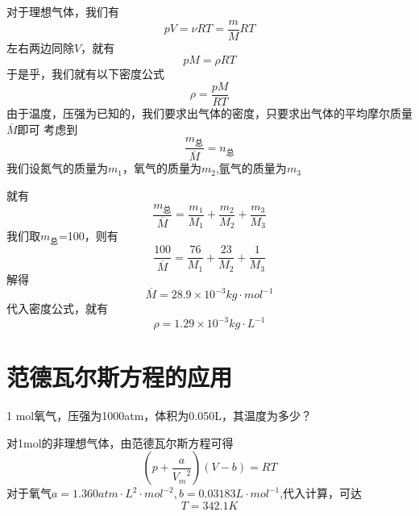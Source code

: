 \documentclass[lang=cn,10pt]{elegantbook}
\begin{document}
	\begin{solution}
		对于理想气体，我们有
		\begin{equation*}
			pV=\nu RT=\frac{m}{M}RT
		\end{equation*}
		左右两边同除$V$，就有
		\begin{equation*}
			pM=\rho RT
		\end{equation*}
		于是乎，我们就有以下密度公式
		\begin{equation}
			\rho=\frac{pM}{RT}
		\end{equation}
		由于温度，压强为已知的，我们要求出气体的密度，只要求出气体的平均摩尔质量$\overline{M}$即可
		考虑到
		\begin{equation*}
			\frac{m_{\text{总}}}{\overline{M}}=n_{\text{总}}
		\end{equation*}
		我们设氮气的质量为$m_{1}$，氧气的质量为$m_{2}$,氩气的质量为$m_{3}$
		
		就有
		\begin{equation*}
			\frac{m_{\text{总}}}{\overline{M}}=\frac{m_{1}}{M_{1}}+\frac{m_{2}}{M_{2}}+\frac{m_{3}}{M_{3}}
		\end{equation*}
		我们取$m_{\text{总}}$=100，则有
		\begin{equation*}
			\frac{100}{\overline{M}}=\frac{76}{M_{1}}+\frac{23}{M_{2}}+\frac{1}{M_{3}}
		\end{equation*}
		解得
		\begin{equation*}
			\overline{M}=28.9\times 10^{-3} kg\cdot mol^{-1}
		\end{equation*}
		代入密度公式，就有
		\begin{equation*}
			\rho =1.29\times 10^{-3}kg\cdot L^{-1}
		\end{equation*}
	\end{solution}
	
	\section{范德瓦尔斯方程的应用}
	
	\begin{example}
		1 mol氧气，压强为1000atm，体积为0.050L，其温度为多少？
	\end{example}
	\begin{solution}
		对1mol的非理想气体，由范德瓦尔斯方程可得
		\begin{equation*}
			\left( p+\frac{a}{{V_m}^2} \right) \left( V-b \right) =RT
		\end{equation*}
		对于氧气$a=1.360atm\cdot L^{2} \cdot mol^{-2},b=0.03183L\cdot mol^{-1}$,代入计算，可达
		\begin{equation*}
			T=342.1K
		\end{equation*}
	\end{solution}
\end{document}
